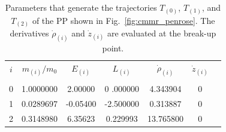 \renewcommand{\arraystretch}{1.2}
\begin{table}[h]
  \centering
  \begin{tabular}{ccccccc}
    \hline\hline
    $i$ & $m_{(i)}/m_0$ & $E_{(i)}$ & $L_{(i)}$         & $\dot{\rho}_{(i)}$ & $\dot{z}_{(i)}$ \\ \vspace{-0.3cm} \\
    0   & 1.0000000     & 2.00000   & 0         .000000 & 4.343904           & 0               \\
    1   & 0.0289697     & -0.05400  & -2.500000         & 0.313887           & 0               \\
    2   & 0.3148980     & 6.35623   & 0.229993          & 13.765800          & 0               \\
    \hline\hline
  \end{tabular}
  \caption{Parameters that generate the trajectories $T_{(0)}$, $T_{(1)}$, and $T_{(2)}$ of the PP shown in Fig.~\ref{fig:cmmr_penrose}. The derivatives $\dot{\rho}_{(i)}$ and $\dot{z}_{(i)}$ are evaluated at the break-up point.}
  \label{tab:cmmr_penrose_example}
\end{table}